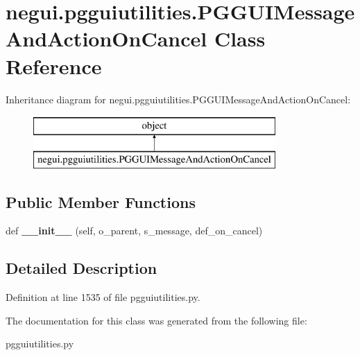 \hypertarget{classnegui_1_1pgguiutilities_1_1PGGUIMessageAndActionOnCancel}{}\section{negui.\+pgguiutilities.\+P\+G\+G\+U\+I\+Message\+And\+Action\+On\+Cancel Class Reference}
\label{classnegui_1_1pgguiutilities_1_1PGGUIMessageAndActionOnCancel}
Inheritance diagram for negui.\+pgguiutilities.\+P\+G\+G\+U\+I\+Message\+And\+Action\+On\+Cancel\+:\begin{figure}[H]
\begin{center}
\leavevmode
\includegraphics[height=2.000000cm]{classnegui_1_1pgguiutilities_1_1PGGUIMessageAndActionOnCancel}
\end{center}
\end{figure}
\subsection*{Public Member Functions}
\begin{DoxyCompactItemize}
\item 
def {\bfseries \+\_\+\+\_\+init\+\_\+\+\_\+} (self, o\+\_\+parent, s\+\_\+message, def\+\_\+on\+\_\+cancel)\hypertarget{classnegui_1_1pgguiutilities_1_1PGGUIMessageAndActionOnCancel_a4274202cb2f6a6ef64a3928c9d433aff}{}\label{classnegui_1_1pgguiutilities_1_1PGGUIMessageAndActionOnCancel_a4274202cb2f6a6ef64a3928c9d433aff}

\end{DoxyCompactItemize}


\subsection{Detailed Description}


Definition at line 1535 of file pgguiutilities.\+py.



The documentation for this class was generated from the following file\+:\begin{DoxyCompactItemize}
\item 
pgguiutilities.\+py\end{DoxyCompactItemize}
